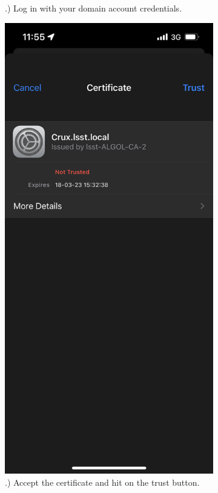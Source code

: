 \begin{figure}
\begin{subfigure}{0.30\textwidth}
      .) Log in with your domain account credentials.
    \end{subfigure}
        \hfill
    \begin{subfigure}{0.30\textwidth}
      \includegraphics[width=\textwidth]{Images/ios3.png}
      .) Accept the certificate and hit on the trust button. 
    \end{subfigure}
  \end{figure} 


